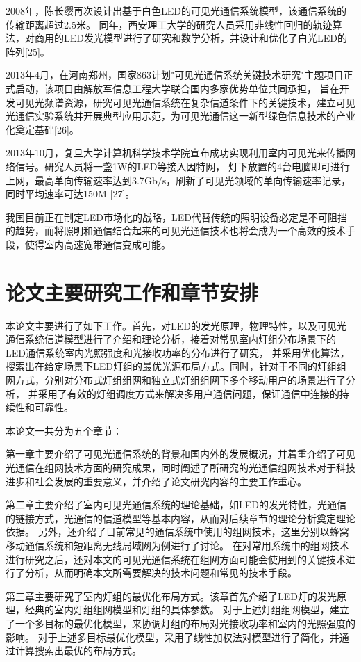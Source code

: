 2008年，陈长缨再次设计出基于白色LED的可见光通信系统模型，该通信系统的传输距离超过2.5米。
同年，西安理工大学的研究人员采用非线性回归的轨迹算法，对商用的LED发光模型进行了研究和数学分析，并设计和优化了白光LED的阵列[25]。

2013年4月，在河南郑州，国家863计划"可见光通信系统关键技术研究"主题项目正式启动，该项目由解放军信息工程大学联合国内多家优势单位共同承担，
旨在开发可见光频谱资源，研究可见光通信系统在复杂信道条件下的关键技术，建立可见光通信实验系统并开展典型应用示范，为可见光通信这一新型绿色信息技术的产业化奠定基础[26]。

2013年10月，复旦大学计算机科学技术学院宣布成功实现利用室内可见光来传播网络信号。研究人员将一盏1W的LED等接入因特网，
灯下放置的4台电脑即可进行上网，最高单向传输速率达到3.7Gb/s，刷新了可见光领域的单向传输速率记录，同时平均速率可达150M [27]。

我国目前正在制定LED市场化的战略，LED代替传统的照明设备必定是不可阻挡的趋势，而将照明和通信结合起来的可见光通信技术也将会成为一个高效的技术手段，使得室内高速宽带通信变成可能。


\section{论文主要研究工作和章节安排}\label{sec:concept}
本论文主要进行了如下工作。首先，对LED的发光原理，物理特性，以及可见光通信系统信道模型进行了介绍和理论分析，接着对常见室内灯组分布场景下的LED通信系统室内光照强度和光接收功率的分布进行了研究，
并采用优化算法，搜索出在给定场景下LED灯组的最优光源布局方式。同时，针对于不同的灯组组网方式，分别对分布式灯组组网和独立式灯组组网下多个移动用户的场景进行了分析，
并采用了有效的灯组调度方式来解决多用户通信问题，保证通信中连接的持续性和可靠性。

本论文一共分为五个章节：

第一章主要介绍了可见光通信系统的背景和国内外的发展概况，并着重介绍了可见光通信在组网技术方面的研究成果，同时阐述了所研究的光通信组网技术对于科技进步和社会发展的重要意义，并介绍了论文研究内容的主要工作重心。

第二章主要介绍了室内可见光通信系统的理论基础，如LED的发光特性，光通信的链接方式，光通信的信道模型等基本内容，从而对后续章节的理论分析奠定理论依据。
另外，还介绍了目前常见的通信系统中使用的组网技术，这里分别以蜂窝移动通信系统和短距离无线局域网为例进行了讨论。
在对常用系统中的组网技术进行研究之后，还对本文的可见光通信系统在组网方面可能会使用到的关键技术进行了分析，从而明确本文所需要解决的技术问题和常见的技术手段。

第三章主要研究了室内灯组的最优化布局方式。该章首先介绍了LED灯的发光原理，经典的室内灯组组网模型和灯组的具体参数。
对于上述灯组组网模型，建立了一个多目标的最优化模型，来协调灯组的布局对光接收功率和室内的光照强度的影响。
对于上述多目标最优化模型，采用了线性加权法对模型进行了简化，并通过计算搜索出最优的布局方式。

